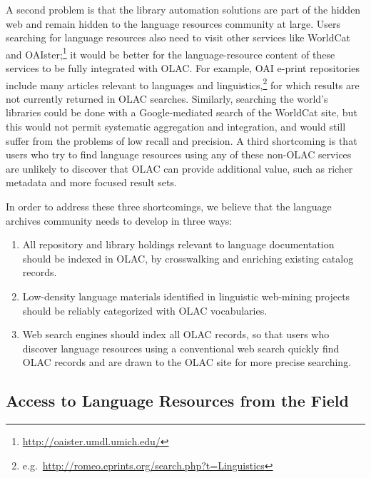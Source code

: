 A second problem is that the library automation solutions are part of
the hidden web and remain hidden to the language resources community
at large.
Users searching for language
resources also need to visit other services like WorldCat and OAIster;\footnote{\scriptsize\url{http://oaister.umdl.umich.edu/}}
it would be better for the language-resource content
of these services to be fully integrated with OLAC.
For example, OAI e-print repositories include many articles
relevant to languages and linguistics,\footnote{e.g.\ \small\url{http://romeo.eprints.org/search.php?t=Linguistics}}
for which results are not currently returned in OLAC searches.
Similarly, searching the world's libraries could be done with a
Google-mediated search of the WorldCat site, but this would not
permit systematic aggregation and integration, and would still suffer
from the problems of low recall and precision.
A third shortcoming is that users who try to find language resources
using any of these non-OLAC services are unlikely to discover that
OLAC can provide additional value, such as richer metadata and more
focused result sets.


In order to address these three shortcomings, we believe that the
language archives community needs to develop in three ways:

\begin{enumerate}\setlength{\itemsep}{0pt}
\item All repository and library holdings relevant to language
      documentation should be indexed in OLAC, by
      crosswalking and enriching existing catalog records.
\item Low-density language materials identified in linguistic web-mining projects
      should be reliably categorized with OLAC vocabularies.
\item Web search engines should index all OLAC records, so that
      users who discover language resources using a conventional 
      web search quickly find OLAC records and are drawn to the
      OLAC site for more precise searching.
\end{enumerate}

\subsection{Access to Language Resources from the Field}

